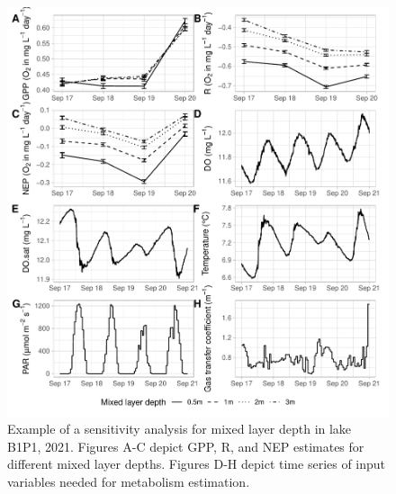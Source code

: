 \documentclass[11pt,lineno]{manuscript}\usepackage[]{graphicx}\usepackage[]{xcolor}
\makeatletter
\def\maxwidth{ %
  \ifdim\Gin@nat@width>\linewidth
    \linewidth
  \else
    \Gin@nat@width
  \fi
}
\makeatother
\begin{document}
\vspace{0.5cm}
\begin{figure}

{\centering \includegraphics[width=\maxwidth]{plots/psensanal2-1} 

}

\caption{\label{fig:sens}Example of a sensitivity analysis for mixed layer depth in lake B1P1, 2021. Figures A-C depict GPP, R, and NEP estimates for different mixed layer depths. Figures D-H depict time series of input variables needed for metabolism estimation.}\label{fig:sensanal2}
\end{figure}


\vspace{0.5cm}
\end{document}
